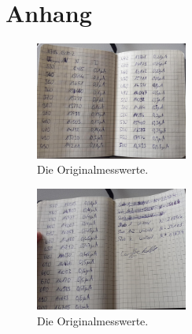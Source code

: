 \section*{Anhang}
\label{sec:anhang}
\begin{figure}[h]
    \centering
    \includegraphics[width = 5cm]{content/mess1.jpg}
    \caption{Die Originalmesswerte.}
    \label{fig:mess1}
  \end{figure}

  \begin{figure}[h]
    \centering
    \includegraphics[width = 5cm]{content/mess2.jpg}
    \caption{Die Originalmesswerte.}
    \label{fig:mess2}
  \end{figure}